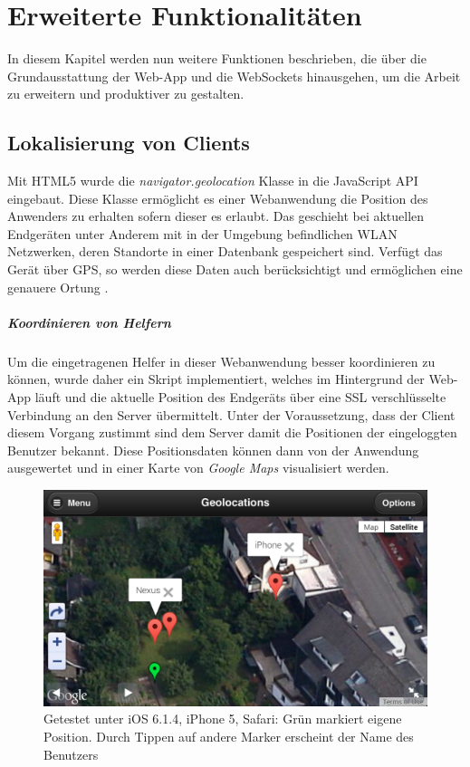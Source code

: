 \chapter{Erweiterte Funktionalitäten}
In diesem Kapitel werden nun weitere Funktionen beschrieben, die über die Grundausstattung der Web-App und die WebSockets hinausgehen, um die Arbeit zu erweitern und produktiver zu gestalten. 


\section{Lokalisierung von Clients}
Mit HTML5 wurde die \emph{navigator.geolocation} Klasse in die JavaScript API eingebaut. Diese Klasse ermöglicht es einer Webanwendung die Position des Anwenders zu erhalten sofern dieser es erlaubt. Das geschieht bei aktuellen Endgeräten unter Anderem mit in der Umgebung befindlichen WLAN Netzwerken, deren Standorte in einer Datenbank gespeichert sind. Verfügt das Gerät über GPS, so werden diese Daten auch berücksichtigt und ermöglichen eine genauere Ortung \cite[1. Absatz]{html5:geolocations}.

\paragraph{Koordinieren von Helfern}
Um die eingetragenen Helfer in dieser Webanwendung besser koordinieren zu können, wurde daher ein Skript implementiert, welches im Hintergrund der Web-App läuft und die aktuelle Position des Endgeräts über eine SSL verschlüsselte Verbindung an den Server übermittelt. Unter der Voraussetzung, dass der Client diesem Vorgang zustimmt sind dem Server damit die Positionen der eingeloggten Benutzer bekannt. Diese Positionsdaten können dann von der Anwendung ausgewertet und in einer Karte von \emph{Google Maps} \cite{google:maps} visualisiert werden.

\begin{figure}[!ht]
	\centering
	\includegraphics[width=15cm]{fig/screenshot_geolocations}
	\caption[Beispielansicht der Geolocations]{Getestet unter iOS 6.1.4, iPhone 5, Safari: Grün markiert eigene Position. Durch Tippen auf andere Marker erscheint der Name des Benutzers}
\end{figure}

